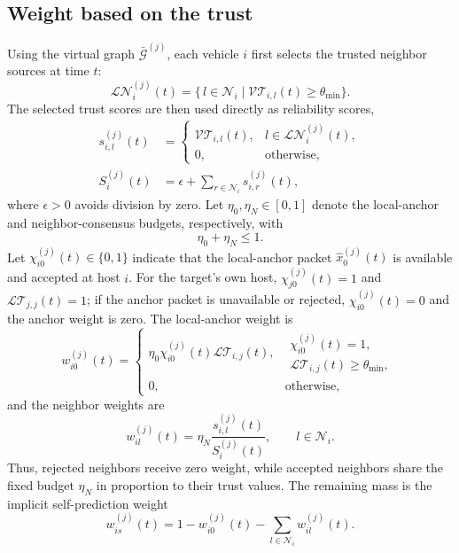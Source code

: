 \documentclass[journal,twoside]{IEEEtran}
\def\G{\mathcal{G}} %
\def\N{\mathcal{N}} %
\def\LT{\mathcal{LT}} %
\def\VT{\mathcal{VT}} %
\begin{document}
\subsection{Weight based on the trust}
Using the virtual graph $\bar{\G}^{(j)}$, each vehicle $i$ first selects the trusted neighbor sources at time $t$:
\begin{equation}
\mathcal{LN}^{(j)}_{i}(t)
= \Big\{\, l \in \N_i \;\big|\; \VT_{i,l}(t) \ge \theta_{\min} \Big\}.
\end{equation}
The selected trust scores are then used directly as reliability scores,
\begin{align}
s_{i,l}^{(j)}(t)
&=
\begin{cases}
\VT_{i,l}(t), & l\in\mathcal{LN}^{(j)}_{i}(t),\\
0, & \text{otherwise},
\end{cases}
\label{new_setneibor}\\
S_i^{(j)}(t)
&=\epsilon+\sum_{r\in\N_i}s_{i,r}^{(j)}(t),
\end{align}
where $\epsilon>0$ avoids division by zero. Let $\eta_0,\eta_N\in[0,1]$ denote the local-anchor and neighbor-consensus budgets, respectively, with
\begin{equation}
    \eta_0+\eta_N\le1 .
\end{equation}
Let $\chi_{i0}^{(j)}(t)\in\{0,1\}$ indicate that the local-anchor packet $\hat{x}_0^{(j)}(t)$ is available and accepted at host $i$. For the target's own host, $\chi_{j0}^{(j)}(t)=1$ and $\LT_{j,j}(t)=1$; if the anchor packet is unavailable or rejected, $\chi_{i0}^{(j)}(t)=0$ and the anchor weight is zero. The local-anchor weight is
\begin{equation}\label{eq_anchor_weight}
w_{i0}^{(j)}(t)=
\begin{cases}
\eta_0\chi_{i0}^{(j)}(t)\LT_{i,j}(t), &
\substack{\chi_{i0}^{(j)}(t)=1,\\ \LT_{i,j}(t)\ge\theta_{\min},}\\
0, & \text{otherwise},
\end{cases}
\end{equation}
and the neighbor weights are
\begin{equation}\label{design_gain}
    w_{il}^{(j)}(t)
    =
    \eta_N
    \frac{s_{i,l}^{(j)}(t)}
    {S_i^{(j)}(t)},
    \qquad l\in\N_i .
\end{equation}
Thus, rejected neighbors receive zero weight, while accepted neighbors share the fixed budget $\eta_N$ in proportion to their trust values. The remaining mass is the implicit self-prediction weight
\begin{equation}
    w_{is}^{(j)}(t)
    =
    1-w_{i0}^{(j)}(t)-\sum_{l\in\N_i}w_{il}^{(j)}(t).
\end{equation}
\end{document}

